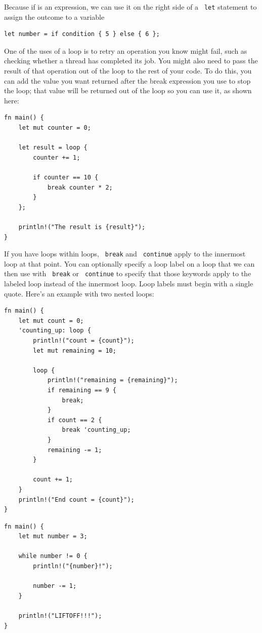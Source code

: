 \documentclass[11pt]{article}
\let\OldTexttt\texttt
\renewcommand{\texttt}[1]{\OldTexttt{\color{MidnightBlue} #1}}
\begin{document}
Because if is an expression, we can use it on the right side of a \texttt{let} statement to assign the
outcome to a variable
\begin{verbatim}
let number = if condition { 5 } else { 6 };
\end{verbatim}

One of the uses of a loop is to retry an operation you know might fail, such as checking whether
a thread has completed its job. You might also need to pass the result of that operation out of
the loop to the rest of your code. To do this, you can add the value you want returned after the
break expression you use to stop the loop; that value will be returned out of the loop so you
can use it, as shown here:
\begin{verbatim}
fn main() {
    let mut counter = 0;

    let result = loop {
        counter += 1;

        if counter == 10 {
            break counter * 2;
        }
    };

    println!("The result is {result}");
}
\end{verbatim}

If you have loops within loops, \texttt{break} and \texttt{continue} apply to the innermost loop at that point.
You can optionally specify a loop label on a loop that we can then use with \texttt{break} or \texttt{continue} to
specify that those keywords apply to the labeled loop instead of the innermost loop. Loop labels
must begin with a single quote. Here’s an example with two nested loops:

\begin{verbatim}
fn main() {
    let mut count = 0;
    'counting_up: loop {
        println!("count = {count}");
        let mut remaining = 10;

        loop {
            println!("remaining = {remaining}");
            if remaining == 9 {
                break;
            }
            if count == 2 {
                break 'counting_up;
            }
            remaining -= 1;
        }

        count += 1;
    }
    println!("End count = {count}");
}
\end{verbatim}

\begin{verbatim}
fn main() {
    let mut number = 3;

    while number != 0 {
        println!("{number}!");

        number -= 1;
    }

    println!("LIFTOFF!!!");
}
\end{verbatim}
\end{document}
